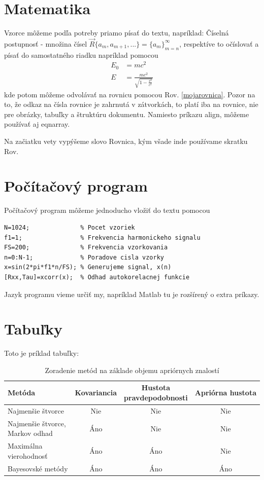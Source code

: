 \section{Matematika}

Vzorce môžeme podľa potreby priamo písať do textu, napríklad: Číselná postupnosť - množina čísel $\vec{R} \{a_m, a_{m+1}, ...\}
= \{a_m\}_{m = n}^\infty$, respektíve to očíslovať a písať do samostatného riadku napríklad pomocou
  \begin{align}
  \label{mojarovnica}
    E_0 &= mc^2                              \\
    E &= \frac{mc^2}{\sqrt{1-\frac{v^2}{c^2}}}
  \end{align}
kde potom môžeme odvolávať na rovnicu pomocou Rov. \eqref{mojarovnica}. Pozor na to, že odkaz na čísla rovnice je zahrnutá v zátvorkách, to platí iba na rovnice, nie pre obrázky, tabuľky a štruktúru dokumentu. Namiesto príkazu align, môžeme používať aj eqnarray.

Na začiatku vety vypýšeme slovo Rovnica, kým všade inde používame skratku Rov.

\section{Počítačový program}

Počítačový program môžeme jednoducho vložiť do textu pomocou
\lstset{language=exMatlab}
\begin{lstlisting}
N=1024;              % Pocet vzoriek
f1=1;                % Frekvencia harmonickeho signalu
FS=200;              % Frekvencia vzorkovania
n=0:N-1;             % Poradove cisla vzorky
x=sin(2*pi*f1*n/FS); % Generujeme signal, x(n)
[Rxx,Tau]=xcorr(x);  % Odhad autokorelacnej funkcie
\end{lstlisting}
Jazyk programu vieme určiť my, napríklad Matlab tu je rozšírený o extra príkazy.


\section{Tabuľky}

Toto je príklad tabuľky:
\begin{table}[!h]
\centering
\caption{Zoradenie metód na základe objemu apriórnych znalostí}
\begin{tabular}{ |l|c|c|c| }
  \hline
  \parbox[c]{3.5cm}{Metóda} & Kovariancia & \parbox[c]{3cm}{Hustota\\pravdepodobnosti}& Apriórna hustota\\ [0.2cm] \hline
  \parbox[c]{3.5cm}{Najmenšie štvorce} & Nie & Nie & Nie \\ [0.2cm] \hline
  \parbox[c]{3.5cm}{Najmenšie štvorce,\\Markov odhad}& Áno & Nie & Nie \\ [0.2cm]   \hline
  \parbox[c]{3.5cm}{Maximálna\\vierohodnosť}& Áno & Áno & Nie \\ [0.2cm] \hline
  \parbox[c]{3.5cm}{Bayesovské metódy} & Áno & Áno & Áno \\ [0.2cm] \hline
\end{tabular}
    \label{TABULKA_3_1}
\end{table}


